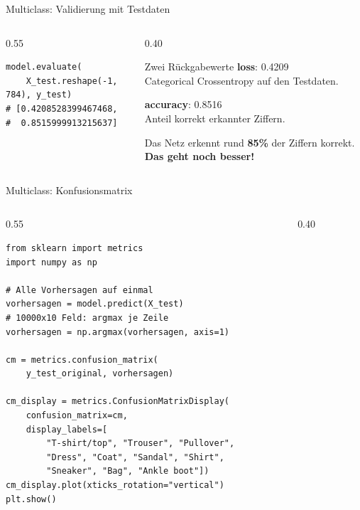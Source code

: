 \begin{frame}[fragile]{Multiclass: Validierung mit Testdaten}
\begin{columns}
\begin{column}{0.55\textwidth}
\begin{verbatim}
model.evaluate(
    X_test.reshape(-1, 784), y_test)
# [0.4208528399467468,
#  0.8515999913215637]
\end{verbatim}
\end{column}
\begin{column}{0.40\textwidth}
\footnotesize
\begin{block}{\footnotesize Zwei Rückgabewerte}
\textbf{loss}: 0.4209\\
Categorical Crossentropy auf den Testdaten.

\vspace{0.3em}
\textbf{accuracy}: 0.8516\\
Anteil korrekt erkannter Ziffern.
\end{block}

Das Netz erkennt rund \textbf{85\%} der Ziffern korrekt. \textbf{Das geht noch besser!}
\end{column}
\end{columns}
\end{frame}

\begin{frame}[fragile]{Multiclass: Konfusionsmatrix}
\begin{columns}
\begin{column}{0.55\textwidth}
\begin{verbatim}
from sklearn import metrics
import numpy as np

# Alle Vorhersagen auf einmal
vorhersagen = model.predict(X_test)
# 10000x10 Feld: argmax je Zeile
vorhersagen = np.argmax(vorhersagen, axis=1)

cm = metrics.confusion_matrix(
    y_test_original, vorhersagen)

cm_display = metrics.ConfusionMatrixDisplay(
    confusion_matrix=cm,
    display_labels=[
        "T-shirt/top", "Trouser", "Pullover",
        "Dress", "Coat", "Sandal", "Shirt",
        "Sneaker", "Bag", "Ankle boot"])
cm_display.plot(xticks_rotation="vertical")
plt.show()
\end{verbatim}
\end{column}
\begin{column}{0.40\textwidth}
\centering

\end{column}
\end{columns}
\end{frame}

